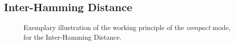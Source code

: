 \subsection{Inter-Hamming Distance}
\label{inter_hd_section}

\begin{figure}[h!]
\centering
{}
\caption{Exemplary illustration of the working principle of the \emph{compact} mode, for the Inter-Hamming Distance.}
\label{img:inter_compact}
\end{figure}


